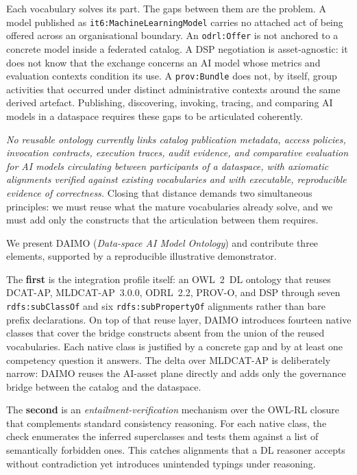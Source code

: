 \documentclass[Afour,sagev,times]{sagej}
\newcommand{\code}[1]{\texttt{#1}}
\begin{document}
Each vocabulary solves its part. The gaps between them are the problem. A model published as \code{it6:MachineLearningModel} carries no attached act of being offered across an organisational boundary. An \code{odrl:Offer} is not anchored to a concrete model inside a federated catalog. A DSP negotiation is asset-agnostic: it does not know that the exchange concerns an AI model whose metrics and evaluation contexts condition its use. A \code{prov:Bundle} does not, by itself, group activities that occurred under distinct administrative contexts around the same derived artefact. Publishing, discovering, invoking, tracing, and comparing AI models in a dataspace requires these gaps to be articulated coherently.

\emph{No reusable ontology currently links catalog publication metadata, access policies, invocation contracts, execution traces, audit evidence, and comparative evaluation for AI models circulating between participants of a dataspace, with axiomatic alignments verified against existing vocabularies and with executable, reproducible evidence of correctness.} Closing that distance demands two simultaneous principles: we must reuse what the mature vocabularies already solve, and we must add only the constructs that the articulation between them requires.

We present DAIMO (\emph{Data-space AI Model Ontology}) and contribute three elements, supported by a reproducible illustrative demonstrator.

The \textbf{first} is the integration profile itself: an OWL~2~DL ontology that reuses DCAT-AP, MLDCAT-AP~3.0.0, ODRL~2.2, PROV-O, and DSP through seven \code{rdfs:subClassOf} and six \code{rdfs:subPropertyOf} alignments rather than bare prefix declarations. On top of that reuse layer, DAIMO introduces fourteen native classes that cover the bridge constructs absent from the union of the reused vocabularies. Each native class is justified by a concrete gap and by at least one competency question it answers. The delta over MLDCAT-AP is deliberately narrow: DAIMO reuses the AI-asset plane directly and adds only the governance bridge between the catalog and the dataspace.

The \textbf{second} is an \emph{entailment-verification} mechanism over the OWL-RL closure that complements standard consistency reasoning. For each native class, the check enumerates the inferred superclasses and tests them against a list of semantically forbidden ones. This catches alignments that a DL reasoner accepts without contradiction yet introduces unintended typings under reasoning.
\end{document}
